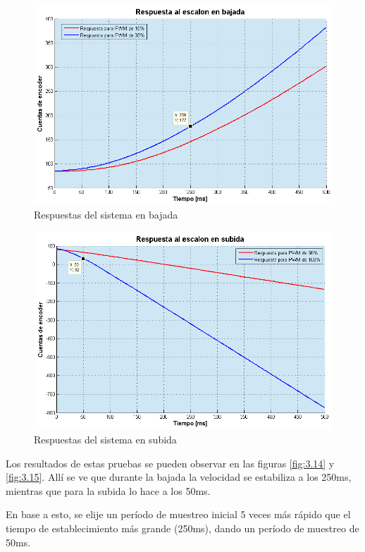 \begin{figure}[!ht]
	\centering
	\includegraphics[width=15cm,scale=1]{resources/3_14-respuestaEnBajada.png}
	\caption{Respuestas del sistema en bajada}
	\label{fig:\thefigure}
\end{figure}

\begin{figure}[!ht]
	\centering
	\includegraphics[width=15cm,scale=1]{resources/3_15-respuestaEnSubida.png}
	\caption{Respuestas del sistema en subida}
	\label{fig:\thefigure}
\end{figure}

Los resultados de estas pruebas se pueden observar en las figuras \ref{fig:3.14} y \ref{fig:3.15}. Allí se ve que durante la bajada la velocidad se estabiliza a los 250ms, mientras que para la subida lo hace a los 50ms. 

En base a esto, se elije un período de muestreo inicial 5 veces más rápido que el tiempo de establecimiento más grande (250ms), dando un período de muestreo de 50ms.

